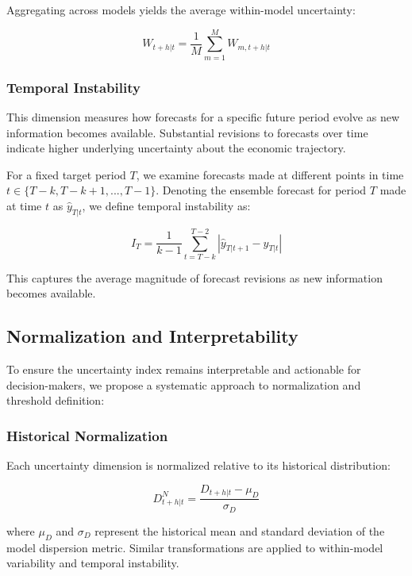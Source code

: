 \documentclass[5p,authoryear]{elsarticle}
\begin{document}
Aggregating across models yields the average within-model uncertainty:

\begin{equation}
W_{t+h|t} = \frac{1}{M} \sum_{m=1}^{M} W_{m,t+h|t}
\end{equation}

\subsubsection{Temporal Instability}

This dimension measures how forecasts for a specific future period evolve as new information becomes available. Substantial revisions to forecasts over time indicate higher underlying uncertainty about the economic trajectory.

For a fixed target period $T$, we examine forecasts made at different points in time $t \in \{T-k, T-k+1, ..., T-1\}$. Denoting the ensemble forecast for period $T$ made at time $t$ as $\hat{y}_{T|t}$, we define temporal instability as:

\begin{equation}
I_T = \frac{1}{k-1} \sum_{t=T-k}^{T-2} |\hat{y}_{T|t+1} - \hat{y}_{T|t}|
\end{equation}

This captures the average magnitude of forecast revisions as new information becomes available.

\subsection{Normalization and Interpretability}

To ensure the uncertainty index remains interpretable and actionable for decision-makers, we propose a systematic approach to normalization and threshold definition:

\subsubsection{Historical Normalization}

Each uncertainty dimension is normalized relative to its historical distribution:

\begin{equation}
D^N_{t+h|t} = \frac{D_{t+h|t} - \mu_D}{\sigma_D}
\end{equation}

where $\mu_D$ and $\sigma_D$ represent the historical mean and standard deviation of the model dispersion metric. Similar transformations are applied to within-model variability and temporal instability.
\end{document}
